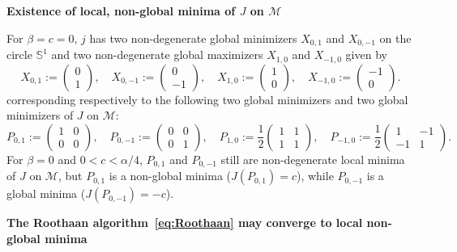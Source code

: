 \documentclass{article}
\newcommand{\1}{{\mathds 1}}
\begin{document}
\noindent
{\bf Existence of local, non-global minima of $J$ on $\mathcal M$}

\medskip

\noindent
For $\beta=c=0$, $j$ has two non-degenerate global minimizers $X_{0,1}$ and $X_{0,-1}$  on the circle $\mathbb S^1$ and two non-degenerate global maximizers $X_{1,0}$ and $X_{-1,0}$ given by 
$$
X_{0,1}:=\left( \begin{array}{c} 0 \\ 1 \end{array} \right), \quad X_{0,-1}:=\left( \begin{array}{c} 0 \\ -1 \end{array} \right), \quad X_{1,0}:=\left( \begin{array}{c} 1 \\ 0 \end{array} \right), \quad X_{-1,0}:=\left( \begin{array}{c} -1 \\ 0 \end{array} \right).
$$
corresponding respectively to the following two global minimizers and two global minimizers of $J$ on $\mathcal M$:
$$
P_{0,1}:=\left( \begin{array}{cc} 1 & 0 \\  0 & 0  \end{array} \right), \quad P_{0,-1}:=\left( \begin{array}{cc} 0 & 0 \\ 0 & 1 \end{array} \right), \quad P_{1,0}:= \frac 12 \left( \begin{array}{cc} 1 & 1 \\ 1 & 1  \end{array} \right), \quad P_{-1,0}:= \frac 12 \left( \begin{array}{rr} 1 & -1 \\ -1 & 1  \end{array} \right).
$$
For $\beta=0$ and $0 < c < \alpha/4$,  $P_{0,1}$ and $P_{0,-1}$ still are non-degenerate local minima of $J$ on $\mathcal M$, but $P_{0,1}$ is a non-global minima ($J(P_{0,1})=c$), while  $P_{0,-1}$ is a global minima ($J(P_{0,-1})=-c$).

\medskip

\noindent
{\bf The Roothaan algorithm~\eqref{eq:Roothaan} may converge to local non-global minima}

\medskip
\end{document}

